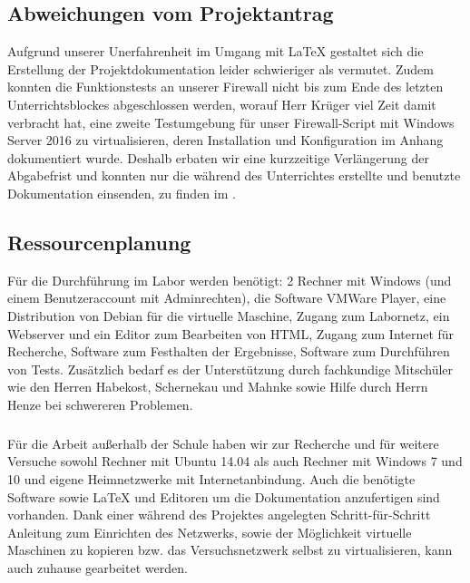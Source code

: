 \subsection{Abweichungen vom Projektantrag}
\label{sec:AbweichungenProjektantrag}

    Aufgrund unserer Unerfahrenheit im Umgang mit \LaTeX{} gestaltet sich die Erstellung der Projektdokumentation leider schwieriger als vermutet. Zudem konnten die Funktionstests an unserer Firewall nicht bis zum Ende des letzten Unterrichtsblockes abgeschlossen werden, worauf Herr Krüger viel Zeit damit verbracht hat, eine zweite Testumgebung für unser Firewall-Script mit Windows Server 2016 zu virtualisieren, deren Installation und Konfiguration im Anhang dokumentiert wurde. Deshalb erbaten wir  eine kurzzeitige Verlängerung der Abgabefrist und konnten nur die während des Unterrichtes erstellte und benutzte Dokumentation einsenden, zu finden im .

\subsection{Ressourcenplanung}
\label{sec:Ressourcenplanung}

Für die Durchführung im Labor werden benötigt: 2 Rechner mit Windows (und einem Benutzeraccount mit Adminrechten), die Software VMWare Player, eine Distribution von Debian für die virtuelle Maschine, Zugang zum Labornetz, ein Webserver und ein Editor zum Bearbeiten von HTML, Zugang zum Internet für Recherche, Software zum Festhalten der Ergebnisse, Software zum Durchführen von Tests. Zusätzlich bedarf es der Unterstützung durch fachkundige Mitschüler wie den Herren Habekost, Schernekau und Mahnke sowie Hilfe durch Herrn Henze bei schwereren Problemen.
\subparagraph{} Für die Arbeit außerhalb der Schule haben wir zur Recherche und für weitere Versuche sowohl Rechner mit Ubuntu 14.04 als auch Rechner mit Windows 7 und 10 und eigene Heimnetzwerke mit Internetanbindung. Auch die benötigte Software sowie \LaTeX{} und Editoren um die Dokumentation anzufertigen sind vorhanden. Dank einer während des Projektes angelegten Schritt-für-Schritt Anleitung zum Einrichten des Netzwerks, sowie der Möglichkeit virtuelle Maschinen zu kopieren bzw. das Versuchsnetzwerk selbst zu virtualisieren, kann auch zuhause gearbeitet werden.


